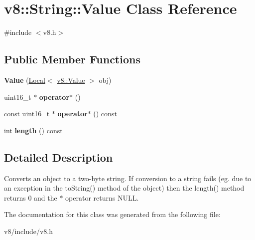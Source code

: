 \hypertarget{classv8_1_1String_1_1Value}{}\section{v8\+:\+:String\+:\+:Value Class Reference}
\label{classv8_1_1String_1_1Value}


{\ttfamily \#include $<$v8.\+h$>$}

\subsection*{Public Member Functions}
\begin{DoxyCompactItemize}
\item 
\hypertarget{classv8_1_1String_1_1Value_a5b968a237946fb3313527797f04a7e0f}{}{\bfseries Value} (\hyperlink{classv8_1_1Local}{Local}$<$ \hyperlink{classv8_1_1Value}{v8\+::\+Value} $>$ obj)\label{classv8_1_1String_1_1Value_a5b968a237946fb3313527797f04a7e0f}

\item 
\hypertarget{classv8_1_1String_1_1Value_ae4f44b1977968de2e9f2ff703437fde3}{}uint16\+\_\+t $\ast$ {\bfseries operator$\ast$} ()\label{classv8_1_1String_1_1Value_ae4f44b1977968de2e9f2ff703437fde3}

\item 
\hypertarget{classv8_1_1String_1_1Value_a1cf21001f92284f290a6e550d567e757}{}const uint16\+\_\+t $\ast$ {\bfseries operator$\ast$} () const \label{classv8_1_1String_1_1Value_a1cf21001f92284f290a6e550d567e757}

\item 
\hypertarget{classv8_1_1String_1_1Value_a4b5014d7d4d0f60d39f37e421ae2eb91}{}int {\bfseries length} () const \label{classv8_1_1String_1_1Value_a4b5014d7d4d0f60d39f37e421ae2eb91}

\end{DoxyCompactItemize}


\subsection{Detailed Description}
Converts an object to a two-\/byte string. If conversion to a string fails (eg. due to an exception in the to\+String() method of the object) then the length() method returns 0 and the $\ast$ operator returns N\+U\+L\+L. 

The documentation for this class was generated from the following file\+:\begin{DoxyCompactItemize}
\item 
v8/include/v8.\+h\end{DoxyCompactItemize}
